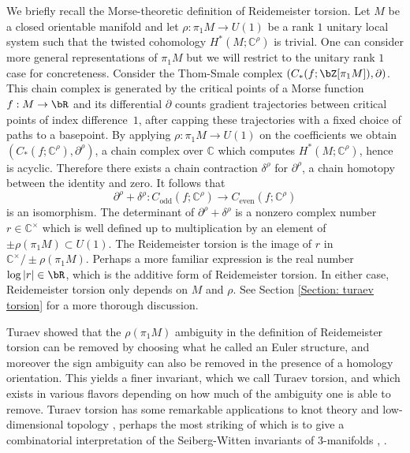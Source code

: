 \documentclass[JEP,XML,SOM,Unicode,NoFloatCountersInSection]{cedram}
\theoremstyle{plain}
\theoremstyle{definition}
\newcommand{\bC}{\mathbb{C}}\newcommand{\bD}{\mathbb{D}}
\begin{document}
We briefly recall the Morse-theoretic definition of Reidemeister torsion. Let $M$ be a closed orientable manifold and let $\rho:\pi_1M \to U(1)$ be a rank $1$ unitary local system such that the twisted cohomology $H^*(M;\bC^\rho)$ is trivial. One can consider more general representations of $\pi_1M$ but we will restrict to the unitary rank $1$ case for concreteness. Consider the Thom-Smale complex $(C_*(f ; \bZ[\pi_1M]), \partial)$. This chain complex is generated by the critical points of a Morse function $f:M \to \bR$ and its differential $\partial$ counts gradient trajectories between critical points of index difference~$1$, after capping these trajectories with a fixed choice of paths to a basepoint. By applying $\rho:\pi_1M \to U(1)$ on the coefficients we obtain $(C_*(f;\bC^\rho), \partial^\rho)$, a chain complex over $\bC$ which computes $H^*(M; \bC^\rho)$, hence is acyclic. Therefore there exists a chain contraction $\delta^\rho$ for $\partial^\rho$, \ie a chain homotopy between the identity and zero. It follows that
\[
\partial^\rho+ \delta^\rho: C_{\text{odd}}(f;\bC^\rho) \to C_{\text{even}}(f;\bC^\rho)
\]
is an isomorphism. The determinant of $\partial^\rho+\delta^\rho$ is a nonzero complex number $r \in \bC^\times$ which is well defined up to multiplication by an element of $\pm \rho( \pi_1M) \subset U(1)$. The Reidemeister torsion is the image of $r$ in $\bC^\times / \pm \rho( \pi_1M)$. Perhaps a more familiar expression is the real number $\log | r | \in \bR$, which is the additive form of Reidemeister torsion. In either case, Reidemeister torsion only depends on $M$ and $\rho$. See Section \ref{Section: turaev torsion} for a more thorough discussion.

Turaev showed that the $\rho(\pi_1M)$ ambiguity in the definition of Reidemeister torsion can be removed by choosing what he called an Euler structure, and moreover the sign ambiguity can also be removed in the presence of a homology orientation. This yields a finer invariant, which we call Turaev torsion, and which exists in various flavors depending on how much of the ambiguity one is able to remove. Turaev torsion has some remarkable applications to knot theory and low-dimensional topology \cite{T86}, perhaps the most striking of which is to give a combinatorial interpretation of the Seiberg-Witten invariants of 3-manifolds \cite{MT96}, \cite{T98}.
\end{document}
